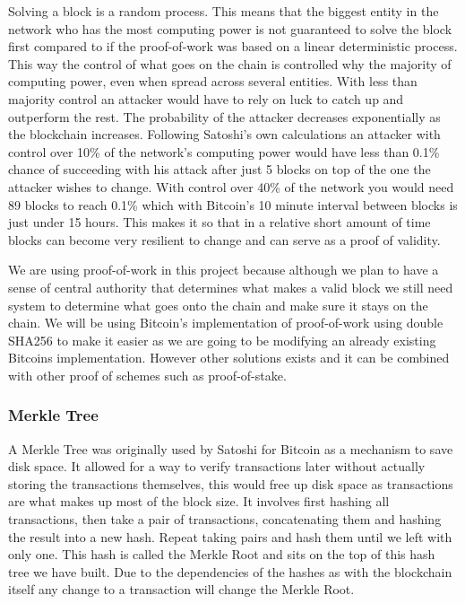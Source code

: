 \documentclass[11pt]{article}
\begin{document}

Solving a block is a random process. This means that the biggest entity in the network who has the most computing power is not guaranteed to solve the block first compared to if the proof-of-work was based on a linear deterministic process. This way the control of what goes on the chain is controlled why the majority of computing power, even when spread across several entities. With less than majority control an attacker would have to rely on luck to catch up and outperform the rest. The probability of the attacker decreases exponentially as the blockchain increases. Following Satoshi's own calculations\cite{nakamoto2009bitcoin} an attacker with control over 10\% of the network's computing power would have less than 0.1\% chance of succeeding with his attack after just 5 blocks on top of the one the attacker wishes to change. With control over 40\% of the network you would need 89 blocks to reach 0.1\% which with Bitcoin's 10 minute interval between blocks is just under 15 hours. This makes it so that in a relative short amount of time blocks can become very resilient to change and can serve as a proof of validity.

We are using proof-of-work in this project because although we plan to have a sense of central authority that determines what makes a valid block we still need system to determine what goes onto the chain and make sure it stays on the chain. We will be using Bitcoin's implementation of proof-of-work using double SHA256 to make it easier as we are going to be modifying an already existing Bitcoins implementation. However other solutions exists and it can be combined with other proof of schemes such as proof-of-stake.

\subsubsection{Merkle Tree}
A Merkle Tree was originally used by Satoshi for Bitcoin as a mechanism to save disk space. It allowed for a way to verify transactions later without actually storing the transactions themselves, this would free up disk space as transactions are what makes up most of the block size. It involves first hashing all transactions, then take a pair of transactions, concatenating them and hashing the result into a new hash. Repeat taking pairs and hash them until we left with only one. This hash is called the Merkle Root and sits on the top of this hash tree we have built. Due to the dependencies of the hashes as with the blockchain itself any change to a transaction will change the Merkle Root.
\end{document}
